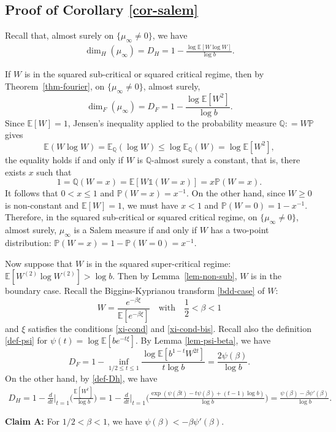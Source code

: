 \documentclass[12pt]{amsart}
\theoremstyle{definition}
\theoremstyle{remark}
\newcommand{\Q}{\mathbb{Q}}
\newcommand{\E}{\mathbb{E}}
\newcommand{\PP}{\mathbb{P}}
\numberwithin{equation}{section}
\begin{document}
\subsection{Proof of Corollary \ref{cor-salem}}
Recall that,  almost surely on $\{\mu_\infty \ne 0\}$, we have 
\begin{align}\label{def-Dh}
\dim_H(\mu_\infty)=D_H=1-\frac{\log \E[W\log W]}{\log b}.
\end{align}

 If $W$ is in the squared sub-critical or squared critical regime,  then by Theorem~\ref{thm-fourier}, on $\{\mu_\infty \ne 0\}$, almost surely, 
\[
\dim_F(\mu_\infty)=D_F=1-\frac{\log \E[W^2]}{\log b}.
\]
Since $\E[W]=1$, Jensen's inequality applied  to the probability measure $\Q:  = W\PP$ gives
\[
 \E(W\log W)= \E_\Q(\log W)\leq   \log \E_\Q(W) = \log \E[W^2 ],
\]
the equality holds if and only if $W$ is $\Q$-almost surely a constant, that is, there exists $x$ such that 
\[
1 = \Q(W= x) = \E[W \mathds{1}(W=x)] = x \PP(W=x). 
\]
It follows that $0< x \le 1$ and $\PP(W=x) =  x^{-1}$. On the other hand, since  $W\ge 0$ is non-constant  and $\E[W]=1$, we must have  $x<1$ and 
$\PP(W =0) =  1 - x^{-1}$. 
Therefore, in the squared sub-critical or squared critical  regime, on $\{\mu_\infty\ne 0\}$, almost surely, $\mu_\infty$ is  a Salem measure if and only if $W$ has a two-point distribution: 
$
\PP(W=x) = 1- \PP(W=0) = x^{-1}. 
$



Now suppose that $W$ is in the squared super-critical regime:
$
\E[W^{(2)}\log W^{(2)}]>\log b.
$
Then  by Lemma~\ref{lem-non-sub}, $W$ is in the boundary case.  Recall the Biggins-Kyprianou transform \eqref{bdd-case} of $W$: 
\[
W= \frac{e^{-\beta \xi}}{\E[e^{-\beta \xi}]}   \quad  \text{with} \quad    \frac{1}{2} < \beta< 1
\]
and $\xi$ satisfies the conditions \eqref{xi-cond} and \eqref{xi-cond-bis}. 
Recall also the definition \eqref{def-psi} for  $\psi(t) =\log \E[be^{-t\xi}]$.  By Lemma \ref{lem-psi-beta}, we have 
\[
 D_F=1 -   \inf_{1/2\le t\le 1} \frac{\log  \E[b^{1-t}W^{2t}]}{ t \log b} = \frac{ 2\psi(\beta)}{\log b}. 
\]
On the other hand,  by \eqref{def-Dh}, we have 
\begin{align*}
D_H=   1 - \frac{d}{dt}\Big|_{t = 1} \Big(  \frac{\E[W^t]}{\log b}\Big)  
 =  1- \frac{d}{dt}\Big|_{t=1}\Big( \frac{ \exp(\psi(\beta t) - t \psi(\beta) + (t-1) \log b)}{\log b}  \Big)  =   \frac{  \psi(\beta) - \beta \psi'(\beta)}{\log b}. 
 \end{align*}
 
\vspace{2mm}
{\flushleft \bf Claim A: } For $1/2 < \beta<1$, we have $\psi(\beta) < - \beta \psi'(\beta)$. 
\vspace{2mm}
\end{document}
